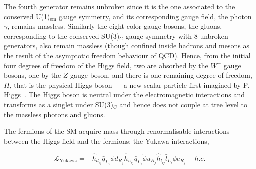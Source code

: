 The fourth generator remains unbroken since it is the one associated to the conserved U(1)$_\text{em}$ gauge symmetry, and its corresponding gauge field, the photon $\gamma$, remains massless. Similarly the eight color gauge bosons, the gluons, corresponding to the conserved SU(3)$_C$ gauge symmetry with 8 unbroken generators, also remain massless (though confined inside hadrons and mesons as the result of the asymptotic freedom behaviour of QCD). Hence, from the initial four degrees of freedom of the Higgs field, two are absorbed by the $W^\pm$ gauge bosons, one by the $Z$ gauge boson, and there is one remaining degree of freedom, $H$, that is the physical Higgs boson — a new scalar particle first imagined by P. Higgs~\cite{PhysRevLett.13.321,PhysRev.145.1156}. The Higgs boson is neutral under the electromagnetic interactions and transforms as a singlet under SU(3)$_C$ and hence does not couple at tree level to the massless photons and gluons.

The fermions of the SM acquire mass through renormalisable interactions between the Higgs field and the fermions: the Yukawa interactions,

\begin{equation}
    \mathcal{L}_\text{Yukawa} = -\hat{h}_{d_{ij}} \bar{q}_{L_i}\phi d_{R_j} \hat{h}_{u_{ij}} \bar{q}_{L_i}\tilde{\phi} u_{R_j} \hat{h}_{l_{ij}} \bar{l}_{L_i}\phi e_{R_j} + h.c.
\end{equation}

